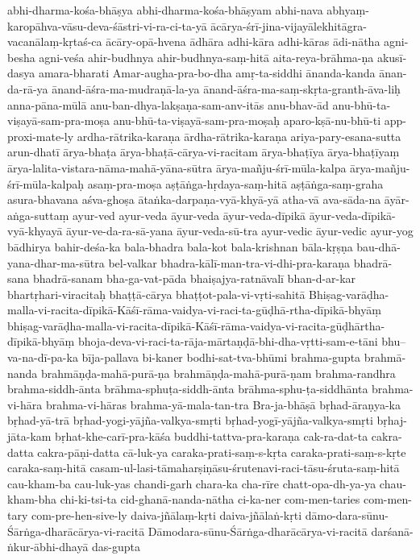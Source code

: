 {abhi-dharma-kośa-bhāṣya
abhi-dharma-kośa-bhāṣyam
abhi-nava
abhyaṃ-karopāhva-vāsu-deva-śāstri-vi-ra-ci-ta-yā
ācārya-śrī-jina-vijayālekhitāgra-vacanālaṃ-kṛtaś-ca
ācāry-opā-hvena
ādhāra
adhi-kāra
adhi-kāras
ādi-nātha
agni-besha
agni-veśa
ahir-budhnya
ahir-budhnya-saṃ-hitā
aita-reya-brāhma-ṇa
akusī-dasya
amara-bharati
Amar-augha-pra-bo-dha
amṛ-ta-siddhi
ānanda-kanda
ānan-da-rā-ya
ānand-āśra-ma-mudraṇā-la-ya
ānand-āśra-ma-saṃ-skṛta-granth-āva-liḥ
anna-pāna-mūlā
anu-ban-dhya-lakṣaṇa-sam-anv-itās
anu-bhav-ād
anu-bhū-ta-viṣayā-sam-pra-moṣa
anu-bhū-ta-viṣayā-sam-pra-moṣaḥ
aparo-kṣā-nu-bhū-ti
app-proxi-mate-ly
ardha-rātrika-karaṇa
ārdha-rātrika-karaṇa
ariya-pary-esana-sutta
arun-dhatī
ārya-bhaṭa
ārya-bhaṭā-cārya-vi-racitam
ārya-bhaṭīya
ārya-bhaṭīyaṃ
ārya-lalita-vistara-nāma-mahā-yāna-sūtra
ārya-mañju-śrī-mūla-kalpa
ārya-mañju-śrī-mūla-kalpaḥ
asaṃ-pra-moṣa
aṣṭāṅga-hṛdaya-saṃ-hitā
aṣṭāṅga-saṃ-graha
asura-bhavana
aśva-ghoṣa
ātaṅka-darpaṇa-vyā-khyā-yā
atha-vā
ava-sāda-na
āyār-aṅga-suttaṃ
ayur-ved
ayur-veda
āyur-veda
āyur-veda-dīpikā
āyur-veda-dīpikā-vyā-khyayā
āyur-ve-da-ra-sā-yana
āyur-veda-sū-tra
ayur-vedic
āyur-vedic
ayur-yog
bādhirya
bahir-deśa-ka
bala-bhadra
bala-kot
bala-krishnan
bāla-kṛṣṇa
bau-dhā-yana-dhar-ma-sūtra
bel-valkar
bhadra-kālī-man-tra-vi-dhi-pra-karaṇa
bhadrā-sana
bhadrā-sanam
bha-ga-vat-pāda
bhaiṣajya-ratnāvalī
bhan-d-ar-kar
bhartṛhari-viracitaḥ
bhaṭṭā-cārya
bhaṭṭot-pala-vi-vṛti-sahitā
Bhiṣag-varāḍha-malla-vi-racita-dīpikā-Kāśī-rāma-vaidya-vi-raci-ta-gūḍhā-rtha-dīpikā-bhyāṃ
bhiṣag-varāḍha-malla-vi-racita-dīpikā-Kāśī-rāma-vaidya-vi-racita-gūḍhārtha-dīpikā-bhyāṃ
bhoja-deva-vi-raci-ta-rāja-mārtaṇḍā-bhi-dha-vṛtti-sam-e-tāni
bhu--va-na-dī-pa-ka
bīja-pallava
bi-kaner
bodhi-sat-tva-bhūmi
brahma-gupta
brahmā-nanda
brahmāṇḍa-mahā-purā-ṇa
brahmāṇḍa-mahā-purā-ṇam
brahma-randhra
brahma-siddh-ānta
brāhma-sphuṭa-siddh-ānta
brāhma-sphu-ṭa-siddhānta
brahma-vi-hāra
brahma-vi-hāras
brahma-yā-mala-tan-tra
Bra-ja-bhāṣā
bṛhad-āraṇya-ka
bṛhad-yā-trā
bṛhad-yogi-yājña-valkya-smṛti
bṛhad-yogī-yājña-valkya-smṛti
bṛhaj-jāta-kam
bṛhat-khe-carī-pra-kāśa
buddhi-tattva-pra-karaṇa
cak-ra-dat-ta
cakra-datta
cakra-pāṇi-datta
cā-luk-ya
caraka-prati-saṃ-s-kṛta
caraka-prati-saṃ-s-kṛte
caraka-saṃ-hitā
casam-ul-lasi-tāmaharṣiṇāsu-śrutenavi-raci-tāsu-śruta-saṃ-hitā
cau-kham-ba
cau-luk-yas
chandi-garh
chara-ka
cha-rīre
chatt-opa-dh-ya-ya
chau-kham-bha
chi-ki-tsi-ta
cid-ghanā-nanda-nātha
ci-ka-ner
com-men-taries
com-men-tary
com-pre-hen-sive-ly
daiva-jñālaṃ-kṛti
daiva-jñālaṅ-kṛti
dāmo-dara-sūnu-Śārṅga-dharācārya-vi-racitā
Dāmodara-sūnu-Śārṅga-dharācārya-vi-racitā
darśanā-ṅkur-ābhi-dhayā
das-gupta
}
